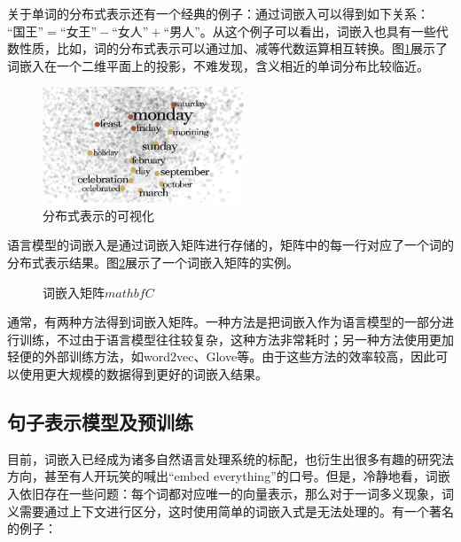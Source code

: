 \parinterval  关于单词的分布式表示还有一个经典的例子：通过词嵌入可以得到如下关系：$\textrm{``国王''}=\textrm{``女王''}-\textrm{``女人''} +\textrm{``男人''}$。从这个例子可以看出，词嵌入也具有一些代数性质，比如，词的分布式表示可以通过加、减等代数运算相互转换。图\ref{fig:5-66}展示了词嵌入在一个二维平面上的投影，不难发现，含义相近的单词分布比较临近。

\begin{figure}[htp]
\centering
\includegraphics[width=6cm]{./Chapter5/Figures/word-graph.jpg}
\caption{分布式表示的可视化}
\label{fig:5-66}
\end{figure}

\parinterval  语言模型的词嵌入是通过词嵌入矩阵进行存储的，矩阵中的每一行对应了一个词的分布式表示结果。图\ref{fig:5-67}展示了一个词嵌入矩阵的实例。

\begin{figure}[htp]
\centering

\caption{词嵌入矩阵$mathbf C$}
\label{fig:5-67}
\end{figure}

\parinterval  通常，有两种方法得到词嵌入矩阵。一种方法是把词嵌入作为语言模型的一部分进行训练，不过由于语言模型往往较复杂，这种方法非常耗时；另一种方法使用更加轻便的外部训练方法，如word2vec\cite{mikolov2013distributed}、Glove\cite{pennington2014glove}等。由于这些方法的效率较高，因此可以使用更大规模的数据得到更好的词嵌入结果。


\subsection{句子表示模型及预训练}

\parinterval  目前，词嵌入已经成为诸多自然语言处理系统的标配，也衍生出很多有趣的研究法方向，甚至有人开玩笑的喊出``embed everything''的口号。但是，冷静地看，词嵌入依旧存在一些问题：每个词都对应唯一的向量表示，那么对于一词多义现象，词义需要通过上下文进行区分，这时使用简单的词嵌入式是无法处理的。有一个著名的例子：

